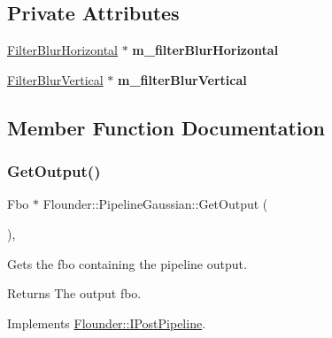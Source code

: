\subsection*{Private Attributes}
\begin{DoxyCompactItemize}
\item 
\mbox{\label{class_flounder_1_1_pipeline_gaussian_a0d9cf0c207fc0b6fc016cb2e3845b0ec}} 
\hyperlink{class_flounder_1_1_filter_blur_horizontal}{Filter\+Blur\+Horizontal} $\ast$ {\bfseries m\+\_\+filter\+Blur\+Horizontal}
\item 
\mbox{\label{class_flounder_1_1_pipeline_gaussian_a17f1036de420fc9718706ba777d1ea89}} 
\hyperlink{class_flounder_1_1_filter_blur_vertical}{Filter\+Blur\+Vertical} $\ast$ {\bfseries m\+\_\+filter\+Blur\+Vertical}
\end{DoxyCompactItemize}


\subsection{Member Function Documentation}
\mbox{\label{class_flounder_1_1_pipeline_gaussian_aafe2b02eac20f2d16dede6df39c21864}} 
\subsubsection{\texorpdfstring{Get\+Output()}{GetOutput()}}
{\footnotesize\ttfamily Fbo $\ast$ Flounder\+::\+Pipeline\+Gaussian\+::\+Get\+Output (\begin{DoxyParamCaption}{ }\end{DoxyParamCaption})\hspace{0.3cm}{\ttfamily [override]}, {\ttfamily [virtual]}}



Gets the fbo containing the pipeline output. 

\begin{DoxyReturn}{Returns}
The output fbo. 
\end{DoxyReturn}


Implements \hyperlink{class_flounder_1_1_i_post_pipeline_a3953881189f3c7876ce4bb5e88f1796c}{Flounder\+::\+I\+Post\+Pipeline}.

